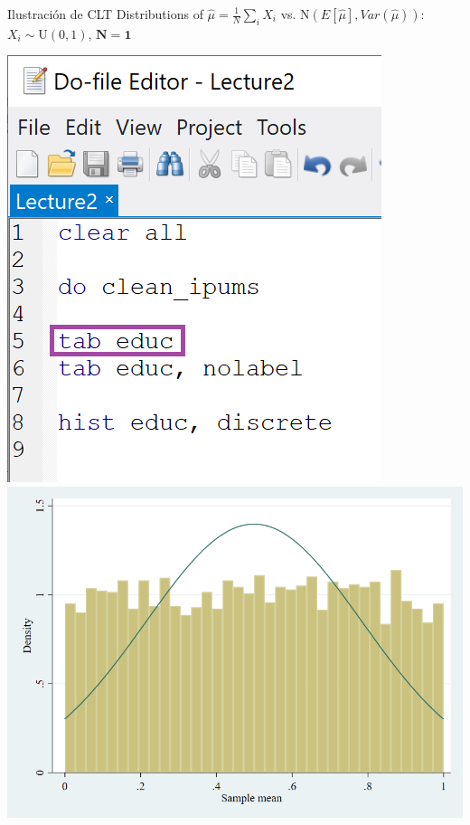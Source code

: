 \documentclass[11pt,handout,aspectratio=169]{beamer}
\begin{document}
\begin{frame}{Ilustración de CLT}
	\vspace{0.2cm}
	Distributions of $\hat{\mu}=\frac{1}{N}\sum_i X_i$ vs. $\mathrm{N}(E[\hat\mu],Var(\hat{\mu}))$: $X_i\sim \mathrm{U}(0,1)$, $\mathbf{N=1}$
	
	\begin{center}
		\includegraphics[scale=0.4]{Stata1.png} \includegraphics[scale=0.25]{sims1.png}
	\end{center}
	
\end{frame}
\end{document}
